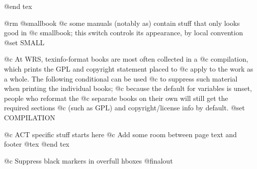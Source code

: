 \def\smallbook{

\global\secheadingskip = 17pt plus 6pt minus 3pt
\global\subsecheadingskip = 14pt plus 6pt minus 3pt

\global\lispnarrowing = 0.3in
\setleading{12pt}
\advance\topskip by -1cm
\global\parskip 3pt plus 1pt
\global\hsize = 5in
\advance\normaloffset by 1in %
\global\vsize=7.5in
\advance\voffset by .7in %
\global\tolerance=1400
\global\hfuzz=1pt
\global\contentsrightmargin=0pt

\global\pagewidth=\hsize
\global\pageheight=\vsize

\global\let\smalllisp=\smalllispx
\global\let\smallexample=\smalllispx
\global\def\Esmallexample{\Esmalllisp}
}\textfonts

\newcount\contentspageno {}
\def\startcontents#1{%
   \pagealignmacro
   \immediate\closeout \tocfile
   \ifnum \pageno>0
      \pageno = \contentspageno		%
   \fi
   \unnumbchapmacro{#1}\def\thischapter{}%
   \begingroup   		%
      \catcode`\\=0  \catcode`\{=1  \catcode`\}=2  \catcode`\@=11
      \raggedbottom             %
      \advance\hsize by -\contentsrightmargin %
}

@end tex

@rm
@smallbook
@c some manuals (notably as) contain stuff that only looks good in
@c smallbook; this switch controls its appearance, by local convention
@set SMALL

@c At WRS, texinfo-format books are most often collected in a
@c compilation, which prints the GPL and copyright statement placed to
@c apply to the work as a whole.  The following conditional can be used
@c to suppress such material when printing the individual books;
@c because the default for variables is unset, people who reformat the
@c separate books on their own will still get the required sections
@c (such as GPL) and copyright/license info by default.
@set COMPILATION

@c ACT specific stuff starts here
@c Add some room between page text and footer
@tex
\gdef\pagebody#1{\vbox to\pageheight{\boxmaxdepth=\maxdepth #1}\vskip 5mm}
@end tex

@c Suppress black markers in overfull hboxes
@finalout
